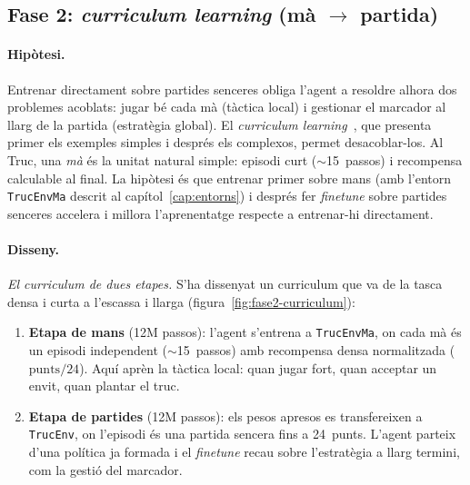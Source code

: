 \subsection{Fase 2: \emph{curriculum learning} (mà $\rightarrow$ partida)}
\label{sec:fase2}

\paragraph{Hipòtesi.} Entrenar directament sobre partides senceres obliga l'agent a
resoldre alhora dos problemes acoblats: jugar bé cada mà (tàctica local) i gestionar el
marcador al llarg de la partida (estratègia global). El \emph{curriculum
learning}~\cite{bengio2009curriculum}, que presenta primer els exemples simples i després
els complexos, permet desacoblar-los. Al Truc, una \emph{mà} és la unitat natural simple:
episodi curt ($\sim$15~passos) i recompensa calculable al final. La hipòtesi és que
entrenar primer sobre mans (amb l'entorn \texttt{TrucEnvMa} descrit al
capítol~\ref{cap:entorns}) i després fer \emph{finetune} sobre partides senceres accelera i
millora l'aprenentatge respecte a entrenar-hi directament.

\paragraph{Disseny.}

\emph{El curriculum de dues etapes.} S'ha dissenyat un curriculum que va de la tasca densa
i curta a l'escassa i llarga (figura~\ref{fig:fase2-curriculum}):
\begin{enumerate}
  \item \textbf{Etapa de mans} (12M passos): l'agent s'entrena a \texttt{TrucEnvMa}, on
        cada mà és un episodi independent ($\sim$15~passos) amb recompensa densa
        normalitzada ($\text{punts}/24$). Aquí aprèn la tàctica local: quan jugar fort,
        quan acceptar un envit, quan plantar el truc.
  \item \textbf{Etapa de partides} (12M passos): els pesos apresos es transfereixen a
        \texttt{TrucEnv}, on l'episodi és una partida sencera fins a 24~punts. L'agent
        parteix d'una política ja formada i el \emph{finetune} recau sobre l'estratègia a
        llarg termini, com la gestió del marcador.
\end{enumerate}

